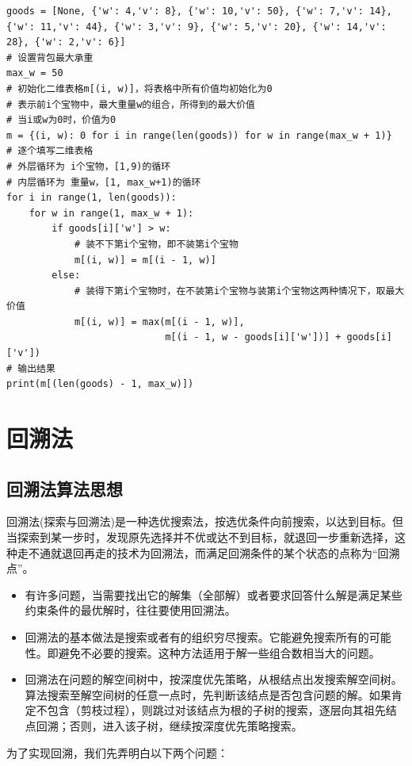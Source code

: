 \begin{lstlisting}
goods = [None, {'w': 4,'v': 8}, {'w': 10,'v': 50}, {'w': 7,'v': 14}, {'w': 11,'v': 44}, {'w': 3,'v': 9}, {'w': 5,'v': 20}, {'w': 14,'v': 28}, {'w': 2,'v': 6}]
# 设置背包最大承重
max_w = 50
# 初始化二维表格m[(i, w)]，将表格中所有价值均初始化为0
# 表示前i个宝物中，最大重量w的组合，所得到的最大价值
# 当i或w为0时，价值为0
m = {(i, w): 0 for i in range(len(goods)) for w in range(max_w + 1)}
# 逐个填写二维表格
# 外层循环为 i个宝物，[1,9)的循环
# 内层循环为 重量w，[1, max_w+1)的循环
for i in range(1, len(goods)):
    for w in range(1, max_w + 1):
        if goods[i]['w'] > w:
            # 装不下第i个宝物，即不装第i个宝物
            m[(i, w)] = m[(i - 1, w)]
        else:
            # 装得下第i个宝物时，在不装第i个宝物与装第i个宝物这两种情况下，取最大价值
            m[(i, w)] = max(m[(i - 1, w)],
                            m[(i - 1, w - goods[i]['w'])] + goods[i]['v'])
# 输出结果
print(m[(len(goods) - 1, max_w)])
\end{lstlisting}

\section{回溯法}

\subsection{回溯法算法思想}

回溯法(探索与回溯法)是一种选优搜索法，按选优条件向前搜索，以达到目标。但当探索到某一步时，发现原先选择并不优或达不到目标，就退回一步重新选择，这种走不通就退回再走的技术为回溯法，而满足回溯条件的某个状态的点称为“回溯点”。

\begin{itemize}
    \item 有许多问题，当需要找出它的解集（全部解）或者要求回答什么解是满足某些约束条件的最优解时，往往要使用回溯法。
    \item 回溯法的基本做法是搜索或者有的组织穷尽搜索。它能避免搜索所有的可能性。即避免不必要的搜索。这种方法适用于解一些组合数相当大的问题。
    \item 回溯法在问题的解空间树中，按深度优先策略，从根结点出发搜索解空间树。算法搜索至解空间树的任意一点时，先判断该结点是否包含问题的解。如果肯定不包含（剪枝过程），则跳过对该结点为根的子树的搜索，逐层向其祖先结点回溯；否则，进入该子树，继续按深度优先策略搜索。
\end{itemize}

为了实现回溯，我们先弄明白以下两个问题：

